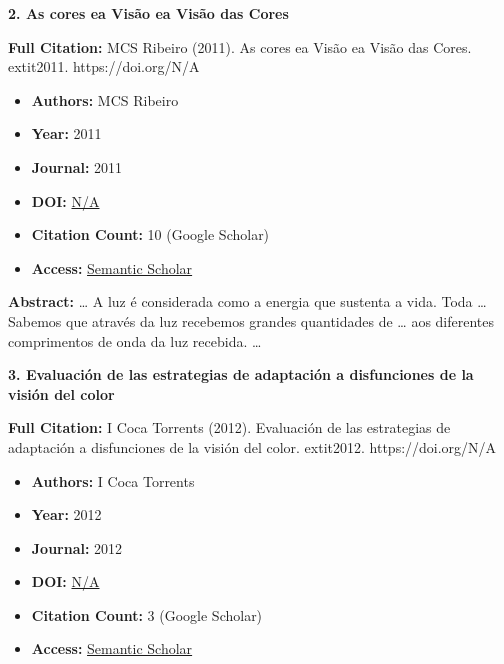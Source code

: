 \documentclass[11pt,a4paper]{article}
\begin{document}
\textbf{2. As cores ea Visão ea Visão das Cores}

\textbf{Full Citation:} MCS Ribeiro (2011). As cores ea Visão ea Visão das Cores. 	extit{2011}. https://doi.org/N/A

\begin{resultbox}
\begin{itemize}[leftmargin=*]
    \item \textbf{Authors:} MCS Ribeiro
    \item \textbf{Year:} 2011
    \item \textbf{Journal:} 2011
    
    
    
    \item \textbf{DOI:} \href{https://doi.org/}{N/A}
    \item \textbf{Citation Count:} 10 (Google Scholar)
    \item \textbf{Access:} \href{https://search.proquest.com/openview/d00872f699d42bae8e5936ff65e42d0a/1?pq-origsite=gscholar&cbl=2026366&diss=y}{Semantic Scholar}
\end{itemize}
\end{resultbox}

\textbf{Abstract:} … A luz é considerada como a energia que sustenta a vida. Toda … Sabemos que através da luz recebemos grandes quantidades de … aos diferentes comprimentos de onda da luz recebida. …\par\vspace{0.5em}



\textbf{3. Evaluación de las estrategias de adaptación a disfunciones de la visión del color}

\textbf{Full Citation:} I Coca Torrents (2012). Evaluación de las estrategias de adaptación a disfunciones de la visión del color. 	extit{2012}. https://doi.org/N/A

\begin{resultbox}
\begin{itemize}[leftmargin=*]
    \item \textbf{Authors:} I Coca Torrents
    \item \textbf{Year:} 2012
    \item \textbf{Journal:} 2012
    
    
    
    \item \textbf{DOI:} \href{https://doi.org/}{N/A}
    \item \textbf{Citation Count:} 3 (Google Scholar)
    \item \textbf{Access:} \href{https://upcommons.upc.edu/entities/publication/286e34af-fb41-42b1-8d35-5fc558f4e080}{Semantic Scholar}
\end{itemize}
\end{resultbox}
\end{document}
